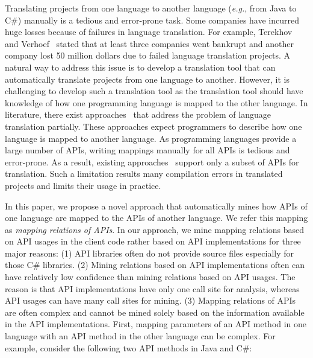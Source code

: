 Translating projects from one language to another language
(\emph{e.g.}, from Java to C\#) manually is a tedious and
error-prone task. Some companies have incurred huge losses because
of failures in language translation. For example, Terekhov and
Verhoef~\cite{terekhov2000realities} stated that at least three
companies went bankrupt and another company lost 50 million dollars
due to failed language translation projects. A natural way to address
this issue is to develop a translation tool that can automatically
translate projects from one language to another. However, it is
challenging to develop such a translation tool as the translation
tool should have knowledge of how one programming language is mapped
to the other language. In literature, there exist
approaches~\cite{mossienko2003automated, yasumatsu1995spice,
hainaut2008migration} that address the problem of language translation
partially. These approaches expect programmers to describe
how one language is mapped to another language.  As programming languages
provide a large number of APIs, writing mappings manually for all APIs
is tedious and error-prone. As a result, existing
approaches~\cite{mossienko2003automated,yasumatsu1995spice,hainaut2008migration}
support only a subset of APIs for translation. Such a limitation results 
many compilation errors in translated projects and limits their usage in practice.

In this paper, we propose a novel approach that automatically mines how APIs of
one language are mapped to the APIs of another language. We refer
this mapping as \emph{mapping relations of APIs}. In our approach,
we mine mapping relations based on API usages in the client
code rather based on API implementations for three major reasons:
(1) API libraries often do not provide source files especially for
those C\# libraries. (2) Mining relations based on API
implementations often can have relatively low confidence than mining
relations based on API usages. The reason is that API
implementations have only one call site for analysis, whereas
API usages can have many call sites for mining. (3) Mapping
relations of APIs are often complex and cannot be mined solely based
on the information available in the API implementations. First,
mapping parameters of an API method in one language with an API
method in the other language can be complex. For example, consider
the following two API methods in Java and C\#:

